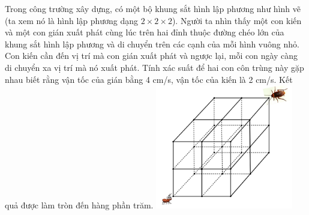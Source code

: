 \begin{ex}%
\immini
{
Trong công trường xây dựng, có một bộ khung sắt hình lập phương như hình vẽ (ta xem nó là hình lập phương dạng $ 2\times 2\times 2$). Người ta nhìn thấy một con kiến và một con gián xuất phát cùng lúc trên hai đỉnh thuộc đường chéo lớn của khung sắt hình lập phương và di chuyển trên các cạnh của mỗi hình vuông nhỏ. Con kiến cần đến vị trí mà con gián xuất phát và ngược lại, mỗi con ngày càng di chuyển xa vị trí mà nó xuất phát. Tính xác suất để hai con côn trùng này gặp nhau biết rằng vận tốc của gián bằng 4 cm/s, vận tốc của kiến là 2 cm/s. Kết quả được làm tròn đến hàng phần trăm.
}
{
    \includegraphics[width=6cm]{img/HXN-1-21}
}
\end{ex}
